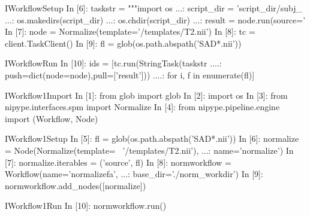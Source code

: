 \documentclass[portrait,final]{baposter}
\begin{document}
\begin{poster}
\begin{SaveVerbatim}{IWorkflowSetup}
In [6]: taskstr = """import os
   ...: script_dir = 'script_dir/subj_%
   ...: os.makedirs(script_dir)
   ...: os.chdir(script_dir)
   ...: result = node.run(source='%
In [7]: node = Normalize(template='/templates/T2.nii')
In [8]: tc = client.TaskClient()
In [9]: fl = glob(os.path.abspath('SAD*.nii'))
\end{SaveVerbatim}

\begin{SaveVerbatim}{IWorkflowRun}
In [10]: ids = [tc.run(StringTask(taskstr%
   ....:        push=dict(node=node),pull=['result']))
   ....:        for i, f in enumerate(fl)]
\end{SaveVerbatim}


\begin{SaveVerbatim}{IWorkflow1Import}
In [1]: from glob import glob
In [2]: import os
In [3]: from nipype.interfaces.spm import Normalize
In [4]: from nipype.pipeline.engine import (Workflow, 
                                            Node)
\end{SaveVerbatim}

\begin{SaveVerbatim}{IWorkflow1Setup}
In [5]: fl = glob(os.path.abspath('SAD*.nii'))
In [6]: normalize = Node(Normalize(template= \
                                '/templates/T2.nii'),
   ...:                  name='normalize')
In [7]: normalize.iterables = ('source', fl)
In [8]: normworkflow = Workflow(name='normalizefa',
   ...:                    base_dir='./norm_workdir')
In [9]: normworkflow.add_nodes([normalize])
\end{SaveVerbatim}

\begin{SaveVerbatim}{IWorkflow1Run}
In [10]: normworkflow.run()
\end{SaveVerbatim}


\end{poster}
\end{document}
